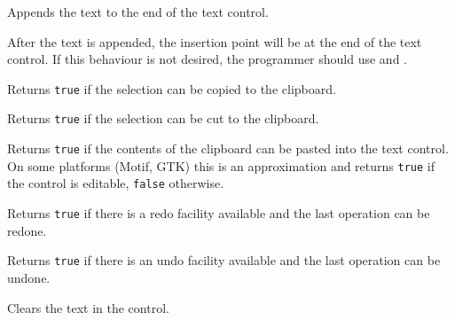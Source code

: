 Appends the text to the end of the text control.




After the text is appended, the insertion point will be at the end of the text control. If this behaviour is not desired,
the programmer should use  and .




\label{wxtextctrlcancopy}


Returns {\tt true} if the selection can be copied to the clipboard.


\label{wxtextctrlcancut}


Returns {\tt true} if the selection can be cut to the clipboard.


\label{wxtextctrlcanpaste}


Returns {\tt true} if the contents of the clipboard can be pasted into the
text control. On some platforms (Motif, GTK) this is an approximation
and returns {\tt true} if the control is editable, {\tt false} otherwise.


\label{wxtextctrlcanredo}


Returns {\tt true} if there is a redo facility available and the last operation
can be redone.


\label{wxtextctrlcanundo}


Returns {\tt true} if there is an undo facility available and the last operation
can be undone.


\label{wxtextctrlclear}


Clears the text in the control.

